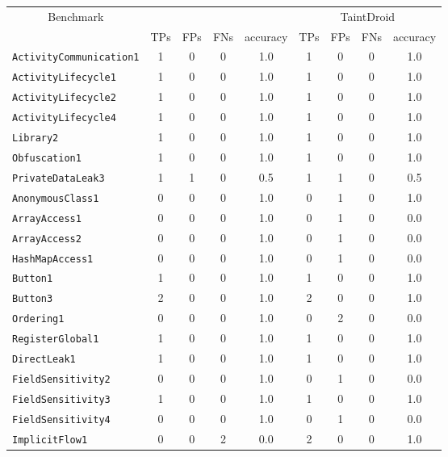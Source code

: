\begin{table}
\begin{small}
\begin{center}
	\begin{tabular}{l|c|c|c|c|c|c|c|c}
	\multicolumn{1}{c|}{\multirow{2}{*}{Benchmark}} & \multicolumn{4}{c|}{\Tool} & \multicolumn{4}{c}{TaintDroid} \\
	\cline{2-9} 
	& TPs & FPs & FNs & accuracy & TPs & FPs & FNs & accuracy \\	
	\hline
	{\tt ActivityCommunication1} 	& 1 & 0 & 0 & 1.0 & 1 & 0 & 0 & 1.0 \\
	{\tt ActivityLifecycle1} 				& 1 & 0 & 0 & 1.0 & 1 & 0 & 0 & 1.0 \\
	{\tt ActivityLifecycle2} 				& 1 & 0 & 0 & 1.0 & 1 & 0 & 0 & 1.0 \\
	{\tt ActivityLifecycle4} 				& 1 & 0 & 0 & 1.0 & 1 & 0 & 0 & 1.0 \\
	{\tt Library2} 								& 1 & 0 & 0 & 1.0 & 1 & 0 & 0 & 1.0 \\
	{\tt Obfuscation1} 						& 1 & 0 & 0 & 1.0 & 1 & 0 & 0 & 1.0 \\
	{\tt PrivateDataLeak3} 				& 1 & 1 & 0 & 0.5 & 1 & 1 & 0 & 0.5 \\
	{\tt AnonymousClass1} 				& 0 & 0 & 0 & 1.0 & 0 & 1 & 0 & 1.0 \\
	{\tt ArrayAccess1} 						& 0 & 0 & 0 & 1.0 & 0 & 1 & 0 & 0.0 \\
	{\tt ArrayAccess2} 						& 0 & 0 & 0 & 1.0 & 0 & 1 & 0 & 0.0 \\
	{\tt HashMapAccess1} 				& 0 & 0 & 0 & 1.0 & 0 & 1 & 0 & 0.0 \\
	{\tt Button1} 								& 1 & 0 & 0 & 1.0 & 1 & 0 & 0 & 1.0 \\
	{\tt Button3} 								& 2 & 0 & 0 & 1.0 & 2 & 0 & 0 & 1.0 \\
	{\tt Ordering1} 							& 0 & 0 & 0 & 1.0 & 0 & 2 & 0 & 0.0 \\
	{\tt RegisterGlobal1} 					& 1 & 0 & 0 & 1.0 & 1 & 0 & 0 & 1.0 \\
	{\tt DirectLeak1} 						& 1 & 0 & 0 & 1.0 & 1 & 0 & 0 & 1.0 \\
	{\tt FieldSensitivity2} 					& 0 & 0 & 0 & 1.0 & 0 & 1 & 0 & 0.0 \\
	{\tt FieldSensitivity3} 					& 1 & 0 & 0 & 1.0 & 1 & 0 & 0 & 1.0 \\
	{\tt FieldSensitivity4} 					& 0 & 0 & 0 & 1.0 & 0 & 1 & 0 & 0.0 \\
	{\tt ImplicitFlow1} 						& 0 & 0 & 2 & 0.0 & 2 & 0 & 0 & 1.0 \\

\end{tabular}
\end{center}
\end{small}
\end{table}
